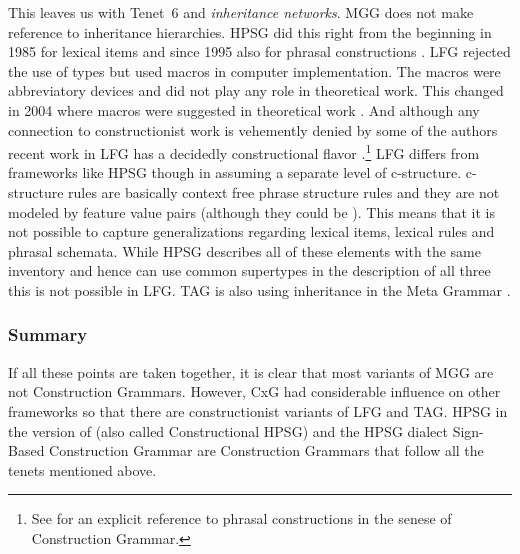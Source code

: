 \documentclass[output=paper]{langsci/langscibook}
\begin{document}
This leaves us with Tenet~6 and \emph{inheritance networks}. MGG does not make reference to inheritance
hierarchies. HPSG did this right from the beginning in 1985 \citep{FPW85a} for lexical items and
since 1995 also for phrasal constructions \citep{Sag97a}. LFG rejected the use of types but used
macros in computer implementation. The macros were abbreviatory devices and did not play any role in
theoretical work. This changed in 2004 where macros were suggested in theoretical work
\citep{DKK2004a}. And although any connection to constructionist work is vehemently denied by some
of the authors recent work in LFG has a decidedly constructional flavor
\citep*{ADT2008a,AGT2014a}.\footnote{
  See  for an explicit reference to phrasal constructions in the senese of
  Construction Grammar.
}
LFG differs from frameworks like HPSG though in assuming a separate level of
c-structure. c-structure rules are basically context free phrase structure rules and they are not
modeled by feature value pairs (although they could be \citep{Kaplan95a}). This means that it is not
possible to capture generalizations regarding lexical items, lexical rules and phrasal
schemata. While HPSG describes all of these elements with the same inventory and hence can use
common supertypes in the description of all three this is not possible in LFG.
TAG is also using inheritance in the Meta Grammar \citet{LK2017a}.

\subsubsection{Summary}

If all these points are taken together, it is clear that most variants of MGG are not Construction
Grammars. However, CxG had considerable influence on other frameworks so that there are
constructionist variants of LFG and TAG. HPSG in the version of \citet{Sag97a} (also called
Constructional HPSG) and the HPSG dialect Sign-Based Construction Grammar are Construction Grammars
that follow all the tenets mentioned above.

\end{document}
